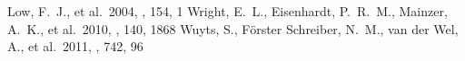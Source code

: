 \documentclass[apj]{emulateapj}
\begin{document}
\begin{thebibliography}{}
  Low, F.~J., et al.\ 2004, \apjs, 154, 1
 Wright, E.~L., Eisenhardt,
  P.~R.~M., Mainzer, A.~K., et al.\ 2010, \aj, 140, 1868
 Wuyts, S., F{\"o}rster Schreiber,
  N.~M., van der Wel, A., et al.\ 2011, \apj, 742, 96
\end{thebibliography}


\clearpage










% 

\end{document}
